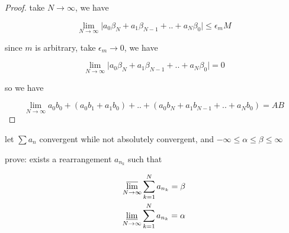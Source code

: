 \begin{proof}
    take $N \to \infty$, we have

    \[
        \lim_{N \to \infty}\lvert a_0\beta_N + a_1 \beta_{N-1} + .. + a_N\beta_{0} \rvert \le \epsilon_m M
    \]

    since $m$ is arbitrary, take $\epsilon_m \to 0$, we have

    \[
        \lim_{N \to \infty}\lvert a_0\beta_N + a_1 \beta_{N-1} + .. + a_N\beta_{0} \rvert = 0
    \]

    so we have

    \[
        \lim_{N \to \infty}a_0b_0 + (a_0b_1 + a_1b_0) + .. + (a_0b_N + a_1b_{N-1} + .. + a_Nb_0) = AB
    \]
\end{proof}

\begin{exercise}
    let $\sum a_n$ convergent while not absolutely convergent, and $-\infty \le \alpha \le \beta \le \infty$ 
    
    prove: exists a rearrangement $a_{n_k}$ such that

    \begin{align*}
        \varlimsup_{N \to \infty}\sum_{k=1}^{N}a_{n_k} = \beta \\
        \varliminf_{N \to \infty}\sum_{k=1}^{N}a_{n_k} = \alpha \\
    \end{align*}

\end{exercise}

